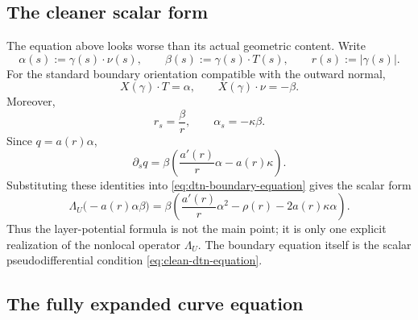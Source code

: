 \documentclass[11pt]{article}
\newcommand{\1}{\mathbf 1}
\begin{document}
\subsection{The cleaner scalar form}

The equation above looks worse than its actual geometric content.  Write
\[
  \alpha(s):=\gamma(s)\cdot\nu(s),
  \qquad
  \beta(s):=\gamma(s)\cdot T(s),
  \qquad
  r(s):=|\gamma(s)|.
\]
For the standard boundary orientation compatible with the outward normal,
\[
  X(\gamma)\cdot T=\alpha,\qquad X(\gamma)\cdot\nu=-\beta.
\]
Moreover,
\[
  r_s=\frac{\beta}{r},
  \qquad
  \alpha_s=-\kappa\beta.
\]
Since \(q=a(r)\alpha\),
\[
  \partial_s q
  =
  \beta\left(\frac{a'(r)}{r}\alpha-a(r)\kappa\right).
\]
Substituting these identities into
\eqref{eq:dtn-boundary-equation} gives the scalar form
\begin{equation}\label{eq:clean-dtn-equation}
  \boxed{
  \Lambda_U\bigl(-a(r)\alpha\beta\bigr)
  =
  \beta\left(
  \frac{a'(r)}{r}\alpha^2-\rho(r)-2a(r)\kappa\alpha
  \right).
  }
\end{equation}
Thus the layer-potential formula is not the main point; it is only one explicit
realization of the nonlocal operator \(\Lambda_U\).  The boundary equation itself is
the scalar pseudodifferential condition \eqref{eq:clean-dtn-equation}.

\subsection{The fully expanded curve equation}
\end{document}
